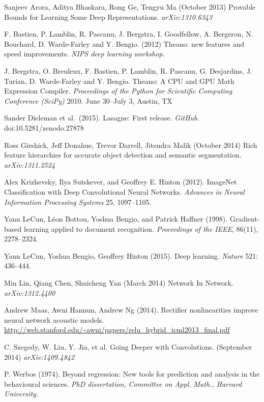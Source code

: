 \documentclass{article}
\begin{document}
\begin{thebibliography}{10}
 Sanjeev Arora, Aditya Bhaskara, Rong Ge, Tengyu Ma (October 2013)  Provable Bounds for Learning Some Deep Representations. \textit{arXiv:1310.6343}

  F. Bastien, P. Lamblin, R. Pascanu, J. Bergstra, I. Goodfellow, A. Bergeron, N. Bouchard, D. Warde-Farley and Y. Bengio. (2012) Theano: new features and speed improvements. \textit{NIPS deep learning workshop.}

  J. Bergstra, O. Breuleux, F. Bastien, P. Lamblin, R. Pascanu, G. Desjardins, J. Turian, D. Warde-Farley and Y. Bengio. Theano: A CPU and GPU Math Expression Compiler. \textit{Proceedings of the Python for Scientific Computing Conference (SciPy)} 2010. June 30--July 3, Austin, TX

  Sander Dieleman et al.\ (2015). Lasagne: First release. \textit{GitHub}. doi:10.5281/zenodo.27878

  Ross Girshick, Jeff Donahue, Trevor Darrell, Jitendra Malik (October 2014)  Rich feature hierarchies for accurate object detection and semantic segmentation. \textit{arXiv:1311.2524}

  Alex Krizhevsky, Ilya Sutskever, and Geoffrey E. Hinton (2012). ImageNet Classification with Deep Convolutional Neural Networks. \textit{Advances in Neural Information Processing Systems} 25, 1097--1105.

  Yann LeCun, L\'{e}on Bottou, Yoshua Bengio, and Patrick Haffner (1998). Gradient-based learning applied to document recognition. \textit{Proceedings of the IEEE}, 86(11), 2278--2324.

  Yann LeCun, Yoshua Bengio, Geoffrey Hinton (2015). Deep learning. \textit{Nature} 521: 436--444.

  Min Lin, Qiang Chen, Shuicheng Yan (March 2014)  Network In Network.  \textit{arXiv:1312.4400}

  Andrew Maas, Awni Hannun, Andrew Ng (2014). Rectifier nonlinearities improve neural network acoustic models. \url{http://web.stanford.edu/~awni/papers/relu_hybrid_icml2013_final.pdf}

  C. Szegedy, W. Liu, Y. Jia, et al. Going Deeper with Convolutions. (September 2014)
\textit{arXiv:1409.4842}

  P. Werbos (1974). Beyond regression: New tools for prediction and analysis in the behavioural sciences. \textit{PhD dissertation, Committee on Appl. Math., Harvard University.}

\end{thebibliography}
\end{document}
